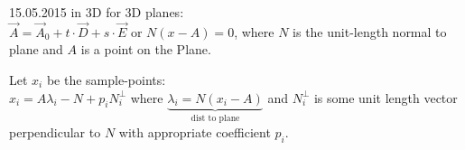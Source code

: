 \documentclass[a4paper,10pt,ngerman]{article}
\begin{document}
\begin{section}{15.05.2015}
 in 3D for 3D planes:\\
 $\vec{A} = \vec{A}_0 + t\cdot \vec{D} + s \cdot \vec{E}$ or $N(x-A) = 0$, where $N$ is the unit-length normal to plane and $A$ is a point on the Plane.
 
 Let $x_i$ be the sample-points:\\
 $x_i = A \lambda_i - N + p_i N_i^\perp$ where $\underbrace{\lambda_i = N(x_i-A)}_{\text{dist to plane}}$ and $N_i^\perp$ is some unit length vector perpendicular to $N$ with appropriate coefficient $p_i$.
 
 \newcommand\ZeichneGerade[6]{%
  \coordinate (Punkt1) at (#1,#2); 
  \coordinate (Punkt2) at (#3,#4); 
  \pgfmathsetmacro\m{(#4-#2)/(#3-#1)}%
  \pgfmathsetmacro\n{#2-\m*#1}%
  \draw plot[domain=#5:#6] (\x,{\m*\x+\n}); 
} 



\end{section}
\end{document}

